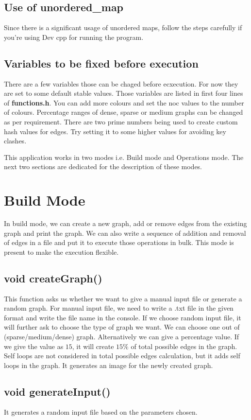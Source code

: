 \documentclass{article}
\begin{document}
\subsection{Use of unordered\_map}
Since there is a significant usage of unordered maps, follow the steps carefully if you're using Dev cpp for running the program.
\subsection{Variables to be fixed before execution}
There are a few variables those can be chaged before ecxecution. For now they are set to some default stable values. Those variables are listed in first four lines of \textbf{functions.h}. You can add more colours and set the noc values to the number of colours. Percentage ranges of dense, sparse or medium graphs can be changed as per requirement. There are two prime numbers being used to create custom hash values for edges. Try setting it to some higher values for avoiding key clashes.

This application works in two modes i.e. Build mode and Operations mode. The next two sections are dedicated for the description of these modes.

\section{Build Mode}
In build mode, we can create a new graph, add or remove edges from the existing graph and print the graph. We can also write a sequence of addition and removal of edges in a file and put it to execute those operations in bulk. This mode is present to make the execution flexible.
\subsection{void createGraph()}
This function asks us whether we want to give a manual input file or generate a random graph. For manual input file, we need to write a .txt file in the given format and write the file name in the console. If we choose random input file, it will further ask to choose the type of graph we want. We can choose one out of (sparse/medium/dense) graph. Alternatively we can give a percentage value. If we give the value as $15$, it will create $15\%$ of total possible edges in the graph. Self loops are not considered in total possible edges calculation, but it adds self loops in the graph. It generates an image for the newly created graph.
\subsection{void generateInput()}
It generates a random input file based on the parameters chosen.
\end{document}
